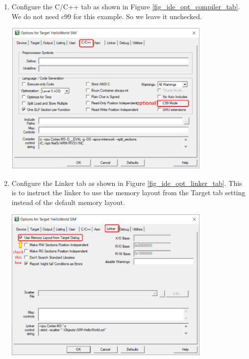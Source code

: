\begin{enumerate}
    \item Configure the C/C++ tab as shown in Figure \ref{fig_ide_opt_compiler_tab}.
      We do not need c99 for this example. So we leave it unchecked. \par

      \begin{minipage}{\linewidth}
        \centering
        \includegraphics[width=4in]{figure/uv5/IDE_opt_compiler_tab}
        \label{fig_ide_opt_compiler_tab}
      \end{minipage}

    \item Configure the Linker tab as shown in Figure \ref{fig_ide_opt_linker_tab}.
      This is to instruct the linker to use the memory layout from the Target tab setting instead of the default memory layout.

      \begin{minipage}{\linewidth}
        \centering
        \includegraphics[width=4in]{figure/uv5/IDE_opt_linker_tab}
        \label{fig_ide_opt_linker_tab}
      \end{minipage}

  \end{enumerate}


